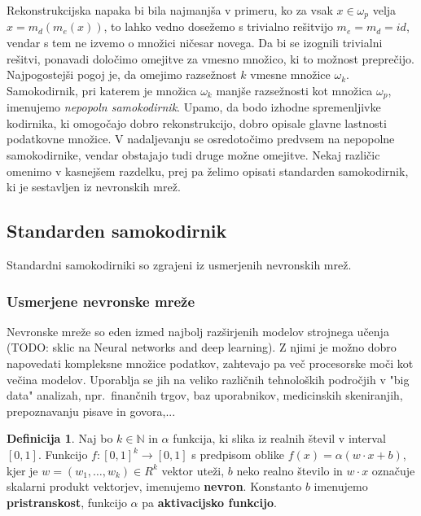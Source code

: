 \documentclass[12pt,a4paper,twoside]{article}
\theoremstyle{definition} %
\newtheorem{definicija}{Definicija}[section]
\theoremstyle{plain} %
\numberwithin{equation}{section}  %
\begin{document}
Rekonstrukcijska napaka bi bila najmanjša v primeru, ko za vsak $x \in \omega_p$ velja $x = m_d(m_e(x))$, to lahko vedno dosežemo s trivialno rešitvijo $m_e = m_d = id$, vendar s tem ne izvemo o množici ničesar novega.
Da bi se izognili trivialni rešitvi, ponavadi določimo omejitve za vmesno množico, ki to možnost preprečijo.
Najpogostejši pogoj je, da omejimo razsežnost $k$ vmesne množice $\omega_k$. 
Samokodirnik, pri katerem je množica $\omega_k$ manjše razsežnosti kot množica $\omega_p$, imenujemo \emph{nepopoln samokodirnik}. 
Upamo, da bodo izhodne spremenljivke kodirnika, ki omogočajo dobro rekonstrukcijo, dobro opisale glavne lastnosti podatkovne množice. 
V nadaljevanju se osredotočimo predvsem na nepopolne samokodirnike, vendar obstajajo tudi druge možne omejitve. 
Nekaj različic omenimo v kasnejšem razdelku, prej pa želimo opisati standarden samokodirnik, ki je sestavljen iz nevronskih mrež. 



\subsection{Standarden samokodirnik}
Standardni samokodirniki so zgrajeni iz usmerjenih nevronskih mrež.



\subsubsection{Usmerjene nevronske mreže}

Nevronske mreže so eden izmed najbolj razširjenih modelov strojnega učenja (TODO: sklic na Neural networks and deep learning). Z njimi je možno dobro napovedati kompleksne množice podatkov, zahtevajo pa več procesorske moči kot večina modelov. Uporablja se jih na veliko različnih tehnoloških področjih v "big data" analizah, npr.\ finančnih trgov, baz uporabnikov, medicinskih skeniranjih, prepoznavanju pisave in govora,... 

\begin{definicija}
Naj bo $k \in \mathbb{N}$ in $\alpha$ funkcija, ki slika iz realnih števil v interval $[0,1]$. 
Funkcijo $f: [0,1]^k \rightarrow [0,1]$ s predpisom oblike $f(x) = \alpha(w\cdot x + b)$, 
kjer je $w=(w_1,\ldots,w_k) \in R^k$ vektor uteži, $b$ neko realno število in $w \cdot x$ označuje skalarni produkt vektorjev, imenujemo \textbf{nevron}. 
Konstanto $b$ imenujemo \textbf{pristranskost}, funkcijo $\alpha$ pa \textbf{aktivacijsko funkcijo}.
\end{definicija}
\end{document}
